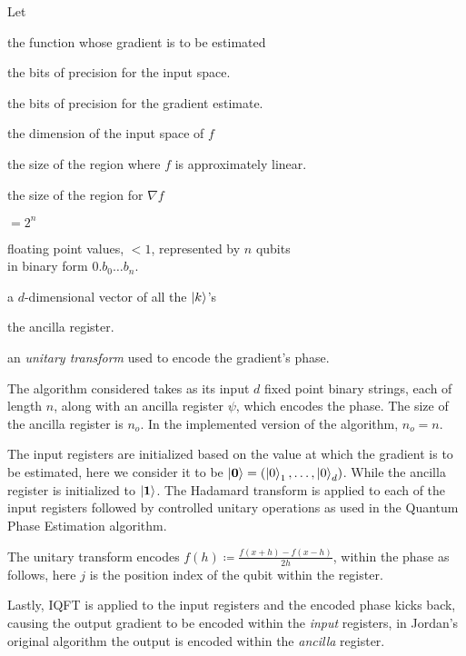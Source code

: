 \documentclass{article}
\begin{document}
\noindent Let
\begin{description}[labelindent=10pt,labelsep=10pt]
  \item[\(f\)] the function whose gradient is to be estimated
  \item[\(n\)] the bits of precision for the input space.
  \item[\(n_o\)] the bits of precision for the gradient estimate.
  \item[\(d\)] the dimension of the input space of \(f\)
  \item[\(h\)] the size of the region where \(f\) is approximately linear.
  \item[\(m\)] the size of the region for \(\nabla f\)
  \item[\(N\)] \(= 2^n\)
  \item[\(\ket k_i\)] floating point values, \(< 1\), represented by \(n\) qubits
    \\ in binary form \(0.b_0\ldots b_n\).
  \item[\(\ket{\mathbf{k}}\)] a \(d\)-dimensional vector of all the \(\ket k\)'s
  \item[\(\ket{\psi}\)] the ancilla register.
  \item[\(U\)] an \textit{unitary transform} used to encode the gradient's phase.
\end{description}

The algorithm considered takes as its input \(d\) fixed point binary strings, each of length
\(n\), along with an ancilla register \(\psi\), which encodes the phase. The size of the ancilla
register is \(n_o\). In the implemented version of the algorithm, \(n_o = n\).

The input registers are initialized based on the value at which the gradient is to be estimated,
here we consider it to be \(\ket{\mathbf{0}} = (\ket{0}_1, \ldots, \ket{0}_d)\). While the ancilla register
is initialized to \(\ket{\mathbf{1}}\). The Hadamard transform is applied to each of the
input registers followed by controlled unitary operations as used in the Quantum Phase Estimation
algorithm. \newline

The unitary transform encodes \(f(h) \coloneqq \frac{f(x + h) - f(x - h)}{2h}\), within the phase
as follows, here \(j\) is the position index of the qubit within the register.

Lastly, IQFT is applied to the input registers and the encoded phase kicks back, causing the output
gradient to be encoded within the \textit{input} registers, in Jordan's original algorithm the output is
encoded within the \textit{ancilla} register.
\end{document}
